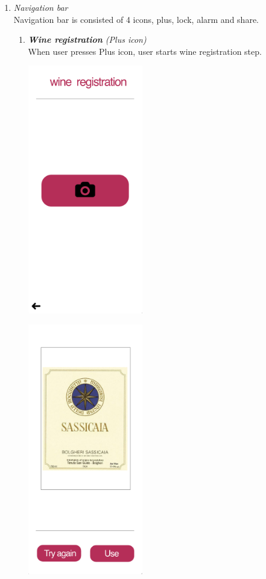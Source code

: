 \documentclass[conference]{IEEEtran}
\numberwithin{figure}{subsection}
\begin{document}
\begin{enumerate}
    \item \textit{Navigation bar}\\
    Navigation bar is consisted of 4 icons, plus, lock, alarm and share.
    
    \begin{enumerate}
        \item \textit{\textbf{Wine registration} (Plus icon)}\\  
        When user presses Plus icon, user starts wine registration step.
        \centerline{\includegraphics[width=5cm]{camera.png}}
        \centerline{\includegraphics[width=5cm]{photo.png}}\begin{enumerate}

\end{enumerate}
\end{enumerate}
\end{enumerate}
\end{document}
